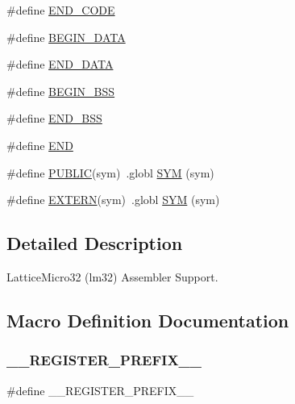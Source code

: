 \begin{DoxyCompactItemize}
\item 
\#define \mbox{\hyperlink{group__RTEMSScoreCPUlm32ASM_gaac423acb743520558daf6a94e1e34534}{E\+N\+D\+\_\+\+C\+O\+DE}}
\item 
\#define \mbox{\hyperlink{group__RTEMSScoreCPUlm32ASM_ga93fba2b033eb50ec004405c59faaa824}{B\+E\+G\+I\+N\+\_\+\+D\+A\+TA}}
\item 
\#define \mbox{\hyperlink{group__RTEMSScoreCPUlm32ASM_gab989978585b78e98ff314e8abb5f9bb0}{E\+N\+D\+\_\+\+D\+A\+TA}}
\item 
\#define \mbox{\hyperlink{group__RTEMSScoreCPUlm32ASM_ga50f110f0489e48ceda4a0473a35d2978}{B\+E\+G\+I\+N\+\_\+\+B\+SS}}
\item 
\#define \mbox{\hyperlink{group__RTEMSScoreCPUlm32ASM_gae8acdd1ba8aa625ce8a829773fd512e2}{E\+N\+D\+\_\+\+B\+SS}}
\item 
\#define \mbox{\hyperlink{group__RTEMSScoreCPUlm32ASM_ga29fd18bed01c4d836c7ebfe73a125c3f}{E\+ND}}
\item 
\#define \mbox{\hyperlink{group__RTEMSScoreCPUlm32ASM_ga5e536c0e80cb78da6a74541281111e40}{P\+U\+B\+L\+IC}}(sym)~.globl \mbox{\hyperlink{group__RTEMSScoreCPUx86-64ASM_gafe05d428a5f345f51fb591debb815325}{S\+YM}} (sym)
\item 
\#define \mbox{\hyperlink{group__RTEMSScoreCPUlm32ASM_ga9808b867f8d1bd54d78548a5cd5dc415}{E\+X\+T\+E\+RN}}(sym)~.globl \mbox{\hyperlink{group__RTEMSScoreCPUx86-64ASM_gafe05d428a5f345f51fb591debb815325}{S\+YM}} (sym)
\end{DoxyCompactItemize}


\subsection{Detailed Description}
Lattice\+Micro32 (lm32) Assembler Support. 



\subsection{Macro Definition Documentation}
\mbox{\label{group__RTEMSScoreCPUlm32ASM_ga08d4062230ffc8494f4be4f6447497e4}} 
\subsubsection{\texorpdfstring{\_\_REGISTER\_PREFIX\_\_}{\_\_REGISTER\_PREFIX\_\_}}
{\footnotesize\ttfamily \#define \+\_\+\+\_\+\+R\+E\+G\+I\+S\+T\+E\+R\+\_\+\+P\+R\+E\+F\+I\+X\+\_\+\+\_\+}

